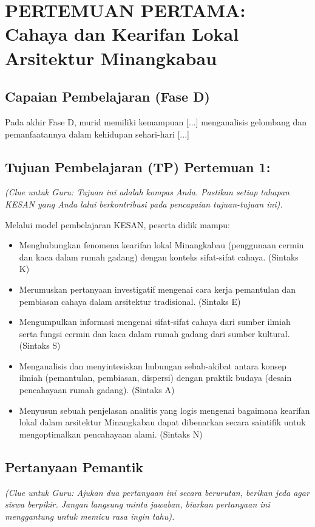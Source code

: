 \documentclass[12pt,a4paper]{article}
\begin{document}
\section{PERTEMUAN PERTAMA: Cahaya dan Kearifan Lokal Arsitektur Minangkabau}

\subsection{Capaian Pembelajaran (Fase D)}
Pada akhir Fase D, murid memiliki kemampuan [...] menganalisis gelombang dan pemanfaatannya dalam kehidupan sehari-hari [...]

\subsection{Tujuan Pembelajaran (TP) Pertemuan 1:}
\textit{(Clue untuk Guru: Tujuan ini adalah kompas Anda. Pastikan setiap tahapan KESAN yang Anda lalui berkontribusi pada pencapaian tujuan-tujuan ini).}

Melalui model pembelajaran KESAN, peserta didik mampu:
\begin{itemize}
\item Menghubungkan fenomena kearifan lokal Minangkabau (penggunaan cermin dan kaca dalam rumah gadang) dengan konteks sifat-sifat cahaya. (Sintaks K)
\item Merumuskan pertanyaan investigatif mengenai cara kerja pemantulan dan pembiasan cahaya dalam arsitektur tradisional. (Sintaks E)
\item Mengumpulkan informasi mengenai sifat-sifat cahaya dari sumber ilmiah serta fungsi cermin dan kaca dalam rumah gadang dari sumber kultural. (Sintaks S)
\item Menganalisis dan menyintesiskan hubungan sebab-akibat antara konsep ilmiah (pemantulan, pembiasan, dispersi) dengan praktik budaya (desain pencahayaan rumah gadang). (Sintaks A)
\item Menyusun sebuah penjelasan analitis yang logis mengenai bagaimana kearifan lokal dalam arsitektur Minangkabau dapat dibenarkan secara saintifik untuk mengoptimalkan pencahayaan alami. (Sintaks N)
\end{itemize}

\subsection{Pertanyaan Pemantik}
\textit{(Clue untuk Guru: Ajukan dua pertanyaan ini secara berurutan, berikan jeda agar siswa berpikir. Jangan langsung minta jawaban, biarkan pertanyaan ini menggantung untuk memicu rasa ingin tahu).}
\end{document}

